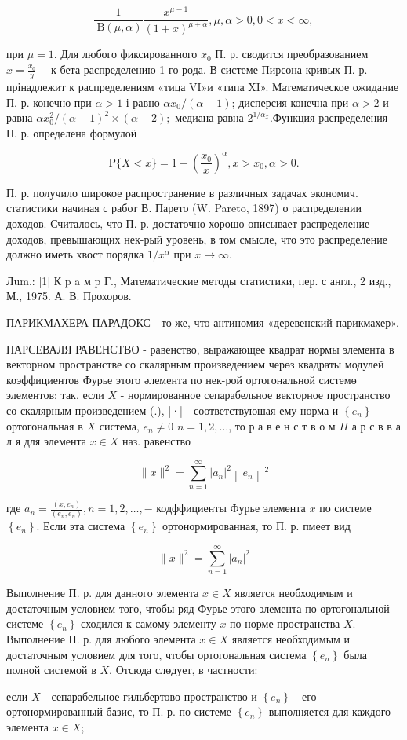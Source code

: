\documentclass[10pt]{article}
\begin{document}
\[
\frac{1}{\mathrm{~B}(\mu, \alpha)} \frac{x^{\mu-1}}{(1+x)^{\mu+\alpha}}, \mu, \alpha>0,0<x<\infty,
\]

при $\mu=1$. Для любого фиксированного $x_{0}$ П. р. сводится преобразованием $x=\frac{x_{0}}{y} \quad$ к бета-распределению 1-го рода. В системе Пирсона кривых П. р. прінадлежит к распределениям «тица VI»и «типа XI». Математическое ожидание П. р. конечно при $\alpha>1$ і равно $\alpha x_{0} /(\alpha-1)$; дисперсия конечна при $\alpha>2$ и равна $\alpha x_{0}^{2} /(\alpha-1)^{2} \times(\alpha-2) ;$ медиана равна $2^{1 / \alpha_{x}}$.Функция распределения П. р. определена формулоӥ

\[
\mathrm{P}\{X<x\}=1-\left(\frac{x_{0}}{x}\right)^{\alpha}, x>x_{0}, \alpha>0 .
\]

П. р. получило широкое распространение в различных задачах экономич. статистики начиная с работ В. Парето (W. Pareto, 1897) о распределении доходов. Считалось, что П. р. достаточно хорошо описывает распределение доходов, превышающих нек-рый уровень, в том смысле, что это распределение должно иметь хвост порядка $1 / x^{\alpha}$ при $x \rightarrow \infty$.

Лum.: [1] К p a м p Г., Математические методы статистики, пер. с англ., 2 изд., М., 1975. $А$. В. Прохоров.

ПАРИКМАХЕРА ПАРАДОКС - то же, что антиномия «деревенский парикмахер».

ПАРСЕВАЛЯ РАВЕНСТВО - равенство, выражающее квадрат нормы элемента в векторном пространстве со скалярным произведением черөз квадраты модулей коэффициентов Фурье этого әлемента по нек-рой ортогональной системө элементов; так, если $X$ - нормированное сепарабельное векторное пространство со скалярным произведением (.), |·| - соответствуюшая ему норма и $\left\{e_{n}\right\}$ - ортогональная в $X$ система, $e_{n} \neq 0$ $n=1,2, \ldots$, то р а в е н с т в о м $\Pi$ а р с в в а л я для элемента $x \in X$ наз. равенство

\[
\|x\|^{2}=\sum_{n=1}^{\infty}\left|a_{n}\right|^{2}\left\|e_{n}\right\|^{2}
\]

где $a_{n}=\frac{\left(x, e_{n}\right)}{\left(e_{n}, e_{n}\right)}, n=1,2, \ldots,-$ кодффициенты Фурье элемента $x$ по системе $\left\{e_{n}\right\}$. Если эта система $\left\{e_{n}\right\}$ ортонормированная, то П. р. пмеет вид

\[
\|x\|^{2}=\sum_{n=1}^{\infty}\left|a_{n}\right|^{2}
\]

Выполнение П. р. для данного элемента $x \in X$ является необходимым и достаточным условием того, чтобы ряд Фурье этого элемента по ортогональной системе $\left\{e_{n}\right\}$ сходился к самому элементу $x$ по норме пространства $X$. Выполнение П. р. для любого элемента $x \in X$ является необходимым и достаточным условием для того, чтобы ортогональная система $\left\{e_{n}\right\}$ была полной системой в $X$. Отсюда слөдует, в частности:

если $X$ - сепарабельное гильбертово пространство и $\left\{e_{n}\right\}$ - его ортонормированный базис, то П. р. по системе $\left\{e_{n}\right\}$ выполняется для каждого элемента $x \in X$;
\end{document}
